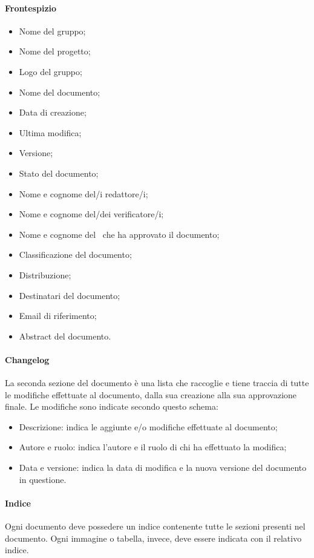 			\paragraph{Frontespizio}
			\begin{itemize}
				\item{Nome del gruppo;}
				\item{Nome del progetto;}
				\item{Logo del gruppo;}
				\item{Nome del documento;}
				\item{Data di creazione;}
				\item{Ultima modifica;}
				\item{Versione;}
				\item{Stato del documento;}
				\item{Nome e cognome del/i redattore/i;}
				\item{Nome e cognome del/dei verificatore/i;}
				\item{Nome e cognome del \RdP\ che ha approvato il documento;}
				\item{Classificazione del documento;}
				\item{Distribuzione;}
				\item{Destinatari del documento;}
				\item{Email di riferimento;}
				\item{Abstract del documento.}
			\end{itemize}
	
			\paragraph{Changelog}
			La seconda sezione del documento è una lista che raccoglie e tiene traccia di tutte le modifiche effettuate al documento, dalla sua creazione alla sua approvazione finale. Le modifiche sono indicate secondo questo schema:
			\begin{itemize}
				\item{Descrizione}: indica le aggiunte e/o modifiche effettuate al documento;
				\item{Autore e ruolo}: indica l’autore e il ruolo di chi ha effettuato la modifica;
				\item{Data e versione}: indica la data di modifica e la nuova versione del documento in questione.
			\end{itemize}	

			\paragraph{Indice}
			Ogni documento deve possedere un indice contenente tutte le sezioni presenti nel documento. Ogni immagine o tabella, invece, deve essere indicata con il relativo indice.

